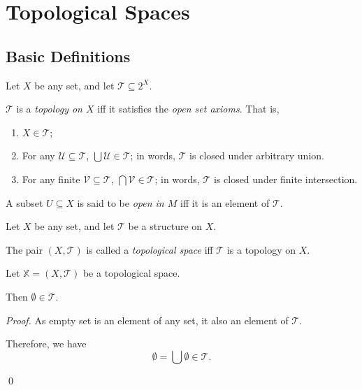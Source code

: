 \chapter{Topological Spaces}


\section{Basic Definitions}


\begin{definition}
	\label{def: open set axioms}
	Let $X$ be any set, and let $\mathcal T \subseteq 2^X$.
	
	$\mathcal T$ is a \textit{topology on $X$} iff it satisfies the \textit{open set axioms}. That is,
	\begin{enumerate}[\bfseries O1.]
		\item $X \in \mathcal T$;
		\item For any $\mathcal U \subseteq \mathcal T$, $\bigcup \mathcal U \in \mathcal T$; in words, $\mathcal T$ is closed under arbitrary union.
		\item For any finite $\mathcal V \subseteq \mathcal T$, $\bigcap \mathcal V \in \mathcal T$; in words, $\mathcal T$ is closed under finite intersection.
	\end{enumerate}
	
	A subset $U \subseteq X$ is said to be \textit{open in $M$} iff it is an element of $\mathcal T$.
\end{definition}


\begin{definition}
	\label{def: topological space}
	Let $X$ be any set, and let $\mathcal T$ be a structure on $X$.
	
	The pair $(X, \mathcal T)$ is called a \textit{topological space} iff $\mathcal T$ is a topology on $X$.
\end{definition}


\begin{theorem}
	\label{thm: empty set is an element of topology}
	Let $\mathbb X = (X, \mathcal T)$ be a topological space.
	
	Then $\emptyset \in \mathcal T$.
	
	\begin{proof}
		As empty set is an element of any set, it also an element of $\mathcal T$.
		
		Therefore, we have
		$$
		\emptyset = \bigcup \emptyset \in \mathcal T.
		$$
		
		\qed
	\end{proof}
\end{theorem}


